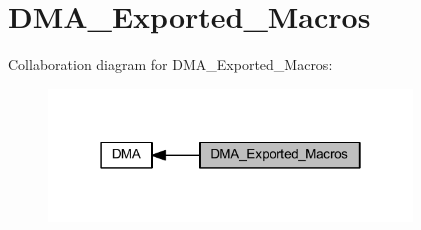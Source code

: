 \hypertarget{group___d_m_a___exported___macros}{}\section{D\+M\+A\+\_\+\+Exported\+\_\+\+Macros}
\label{group___d_m_a___exported___macros}
Collaboration diagram for D\+M\+A\+\_\+\+Exported\+\_\+\+Macros\+:
\nopagebreak
\begin{figure}[H]
\begin{center}
\leavevmode
\includegraphics[width=274pt]{group___d_m_a___exported___macros}
\end{center}
\end{figure}
